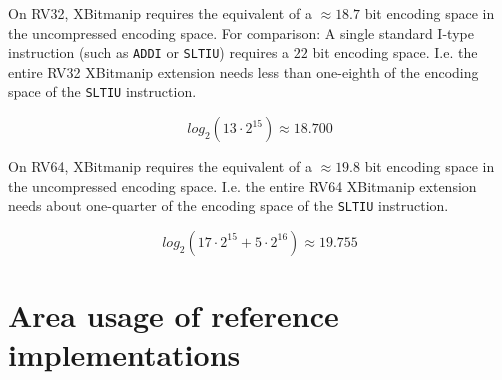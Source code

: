 On RV32, XBitmanip requires the equivalent of a $\approx 18.7$ bit encoding space in
the uncompressed encoding space. For comparison: A single standard I-type
instruction (such as \texttt{ADDI} or \texttt{SLTIU}) requires a $22$ bit
encoding space. I.e. the entire RV32 XBitmanip extension needs less than
one-eighth of the encoding space of the \texttt{SLTIU} instruction.

$$ log_2(13\cdot2^{15}) \approx 18.700 $$

On RV64, XBitmanip requires the equivalent of a $\approx 19.8$ bit encoding
space in the uncompressed encoding space. I.e. the entire RV64 XBitmanip
extension needs about one-quarter of the encoding space of the \texttt{SLTIU}
instruction.

$$ log_2(17\cdot2^{15} + 5\cdot2^{16}) \approx 19.755 $$

\section{Area usage of reference implementations}
\label{cores}

